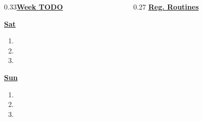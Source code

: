 \documentclass[serif,mathserif,final]{beamer}
\begin{document}
\begin{frame}{}
\begin{columns}[t]
\begin{column}{0.33\linewidth}{\textbf{\underline{Week TODO}}}
\begin{block}
\textbf{\underline{Sat}}

\begin{enumerate} 
\tiny \item \tiny 
\item \tiny 
\item \tiny 
\end{enumerate} 


\textbf{\underline{Sun}}

\begin{enumerate} 
\tiny \item \tiny 
\item \tiny 
\item \tiny 
\end{enumerate} 

\end{block} 

\end{column}%

\begin{column}{0.27\linewidth} {\textbf{\underline{Reg. Routines}}}


\end{column}
\end{columns}
\end{frame}
\end{document}
